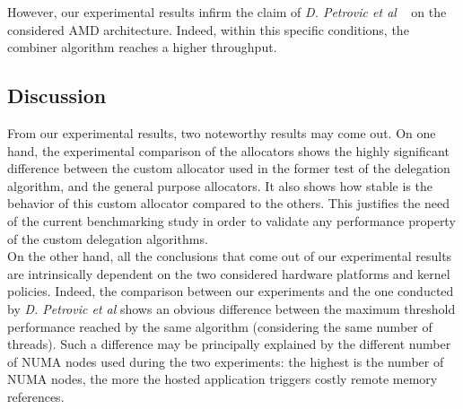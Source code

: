 \documentclass[10pt]{article}											%
\begin{document}
However, our experimental results infirm the claim of \emph{D. Petrovic et al} ~\cite{delegationCS_roparsPetrovic} on the considered AMD architecture.   Indeed, within this specific conditions, the combiner algorithm reaches a higher throughput.\\



\subsection{Discussion}
From our experimental results, two noteworthy results may come out.   On one hand, the experimental comparison of the allocators shows the highly significant difference between the custom allocator used in the former test of the delegation algorithm, and the general purpose allocators.   It also shows how stable is the behavior of this custom allocator compared to the others.   This justifies the need of the current benchmarking study in order to validate any performance property of the custom delegation algorithms.\\

On the other hand, all the conclusions that come out of our experimental results are intrinsically dependent on the two considered hardware platforms and kernel policies.   Indeed, the comparison between our experiments and the one conducted by \textit{D. Petrovic et al} shows an obvious difference between the maximum threshold performance reached by the same algorithm (considering the same number of threads).   Such a difference may be principally explained by the different number of NUMA nodes used during the two experiments:  the highest is the number of NUMA nodes, the more the hosted application triggers costly remote memory references.
\end{document}
